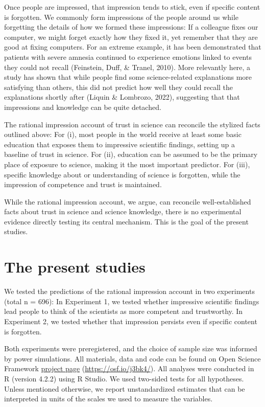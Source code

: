 \documentclass[
  doc,floatsintext]{apa6}
\begin{document}
Once people are impressed, that impression tends to stick, even if specific content is forgotten. We commonly form impressions of the people around us while forgetting the details of how we formed these impressions: If a colleague fixes our computer, we might forget exactly how they fixed it, yet remember that they are good at fixing computers. For an extreme example, it has been demonstrated that patients with severe amnesia continued to experience emotions linked to events they could not recall (Feinstein, Duff, \& Tranel, 2010). More relevantly here, a study has shown that while people find some science-related explanations more satisfying than others, this did not predict how well they could recall the explanations shortly after (Liquin \& Lombrozo, 2022), suggesting that that impressions and knowledge can be quite detached.

The rational impression account of trust in science can reconcile the stylized facts outlined above: For (i), most people in the world receive at least some basic education that exposes them to impressive scientific findings, setting up a baseline of trust in science. For (ii), education can be assumed to be the primary place of exposure to science, making it the most important predictor. For (iii), specific knowledge about or understanding of science is forgotten, while the impression of competence and trust is maintained.

While the rational impression account, we argue, can reconcile well-established facts about trust in science and science knowledge, there is no experimental evidence directly testing its central mechanism. This is the goal of the present studies.

\section{The present studies}\label{the-present-studies}

We tested the predictions of the rational impression account in two experiments (total n = 696): In Experiment 1, we tested whether impressive scientific findings lead people to think of the scientists as more competent and trustworthy. In Experiment 2, we tested whether that impression persists even if specific content is forgotten.

Both experiments were preregistered, and the choice of sample size was informed by power simulations. All materials, data and code can be found on Open Science Framework \href{https://osf.io/j3bk4/}{project page} (\url{https://osf.io/j3bk4/}). All analyses were conducted in R (version 4.2.2) using R Studio. We used two-sided tests for all hypotheses. Unless mentioned otherwise, we report unstandardized estimates that can be interpreted in units of the scales we used to measure the variables.
\end{document}
